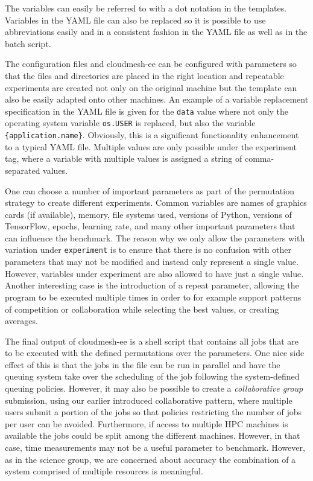 \documentclass[utf8]{FrontiersinVancouver} %
\begin{document}
The variables can easily be referred to with a dot notation in the templates.  Variables in the YAML file can also be replaced so it is possible to use abbreviations easily and in a consistent fashion in the YAML file as well as in the batch script.

The configuration files and cloudmesh-ee can be configured with parameters so that the files and directories are placed in the right location and repeatable experiments are created not only on the original machine but the template can also be easily adapted onto other machines. An example of a variable replacement specification in the YAML file is given for the \verb|data| value where not only the operating system variable \verb|os.USER| is replaced, but also the variable \verb|{application.name}|. Obviously, this is a significant functionality enhancement to a typical YAML file.  Multiple values are only possible under the experiment tag, where a variable with multiple values is assigned a string of comma-separated values.

One can choose a number of important parameters as part of the permutation strategy to create different experiments. Common variables are names of graphics cards (if available), memory, file systems used, versions of Python, versions of TensorFlow, epochs, learning rate, and many other important parameters that can influence the benchmark.  The reason why we only allow the parameters with variation under \verb|experiment| is to ensure that there is no confusion with other parameters that may not be modified and instead only represent a single value. However, variables under experiment are also allowed to have just a single value.  Another interesting case is the introduction of a repeat parameter, allowing the program to be executed multiple times in order to for example support patterns of competition or collaboration while selecting the best values, or creating averages.


The final output of cloudmesh-ee is a shell script that contains all jobs that are to be executed with the defined permutations over the parameters. One nice side effect of this is that the jobs in the file can be run in parallel and have the queuing system take over the scheduling of the job following the system-defined queuing policies. However, it may also be possible to create a {\it collaborative group} submission, using our earlier introduced collaborative pattern, where multiple users submit a portion of the jobs so that policies restricting the number of jobs per user can be avoided. Furthermore, if access to multiple HPC machines is available the jobs could be split among the different machines. However, in that case, time measurements may not be a useful parameter to benchmark. However, as in the science group, we are concerned about accuracy the combination of a system comprised of multiple resources is meaningful.
\end{document}
